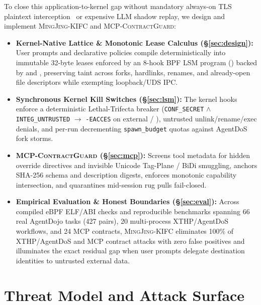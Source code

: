 \documentclass[10pt,twocolumn,letterpaper]{article}
\newcommand{\sys}{\textsc{MingJing-KIFC}}
\newcommand{\guard}{\textsc{MCP-ContractGuard}}
\newcommand{\code}[1]{\texttt{\small #1}}
\begin{document}
To close this application-to-kernel gap without mandatory always-on TLS plaintext interception~\cite{agentsight2025} or expensive LLM shadow replay, we design and implement \sys{} and \guard{}:
\begin{itemize}
  \item \textbf{Kernel-Native Lattice \& Monotonic Lease Calculus (\S\ref{sec:design}):} User prompts and declarative  policies compile deterministically into immutable 32-byte leases enforced by an 8-hook BPF LSM program () backed by  and , preserving taint across forks, hardlinks, renames, and already-open file descriptors while exempting loopback/UDS IPC.
  \item \textbf{Synchronous Kernel Kill Switches (\S\ref{sec:lsm}):} The kernel hooks enforce a deterministic Lethal-Trifecta breaker (\code{CONF\_SECRET} $\land$ \code{INTEG\_UNTRUSTED} $\to$ \code{-EACCES} on external  / ), untrusted unlink/rename/exec denials, and per-run decrementing \code{spawn\_budget} quotas against AgentDoS fork storms.
  \item \textbf{\guard{} (\S\ref{sec:mcp}):} Screens tool metadata for hidden override directives and invisible Unicode Tag-Plane / BiDi smuggling, anchors SHA-256 schema and description digests, enforces monotonic capability intersection, and quarantines mid-session rug pulls fail-closed.
  \item \textbf{Empirical Evaluation \& Honest Boundaries (\S\ref{sec:eval}):} Across compiled eBPF ELF/ABI checks and reproducible benchmarks spanning 66 real AgentDojo tasks (427 pairs), 20 multi-process XTHP/AgentDoS workflows, and 24 MCP contracts, \sys{} eliminates 100\% of XTHP/AgentDoS and MCP contract attacks with zero false positives and illuminates the exact residual gap when user prompts delegate destination identities to untrusted external data.
\end{itemize}

\section{Threat Model and Attack Surface}
\label{sec:threat}
\end{document}
